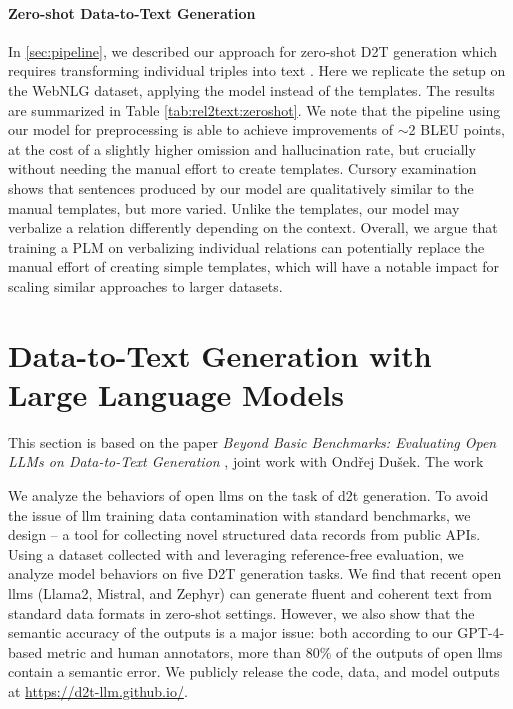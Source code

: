 \paragraph{Zero-shot Data-to-Text Generation} In \autoref{sec:pipeline}, we described our approach for zero-shot D2T generation which requires transforming individual triples into text \cite{kasner2022neural}. Here we replicate the setup on the WebNLG dataset, applying the \BARTr{} model instead of the templates. The results are summarized in Table \ref{tab:rel2text:zeroshot}.  We note that the pipeline using our model for preprocessing is able to achieve improvements of $\sim$2 BLEU points, at the cost of a slightly higher omission and hallucination rate, but crucially without needing the manual effort to create templates. Cursory examination shows that sentences produced by our model are qualitatively similar to the manual templates, but more varied. Unlike the templates, our model may verbalize a relation differently depending on the context.
Overall, we argue that training a PLM on verbalizing individual relations can potentially replace the manual effort of creating simple templates, which will have a notable impact for scaling similar approaches to larger datasets.




\section{Data-to-Text Generation with Large Language Models}
\label{sec:quintd}

\begin{refbox}
    This section is based on the paper \emph{Beyond Basic Benchmarks: Evaluating Open LLMs on Data-to-Text Generation} \cite{kasnerReferenceBasedMetricsAnalyzing2024}, joint work with Ondřej Dušek. The work 
\end{refbox}

We analyze the behaviors of open \acp{llm} on the task of \ac{d2t} generation. To avoid the issue of \ac{llm} training data contamination with standard benchmarks, we design \datatool{} -- a tool for collecting novel structured data records from public APIs. Using a dataset collected with \datatool and leveraging reference-free evaluation, we analyze model behaviors on five D2T generation tasks.
We find that recent open \acp{llm} (Llama2, Mistral, and Zephyr) can generate fluent and coherent text from standard data formats in zero-shot settings. However, we also show that the semantic accuracy of the outputs is a major issue: both according to our GPT-4-based metric and human annotators, more than 80\% of the outputs of open \acp{llm} contain a semantic error. We publicly release the code, data, and model outputs at \url{https://d2t-llm.github.io/}.


